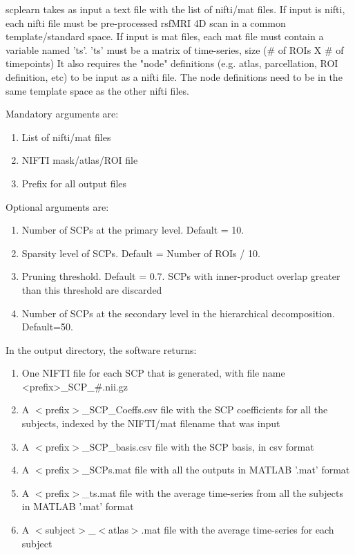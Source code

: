 \documentclass[12pt]{article}
\begin{document}
scplearn takes as input a text file with the list of nifti/mat files. If input is nifti, each nifti file must be pre-processed rsfMRI 4D scan in a common template/standard space. If input is mat files, each mat file must contain a variable named 'ts'. 'ts' must be a matrix of time-series,  size (\# of ROIs X \# of timepoints) It also requires the "node" definitions (e.g. atlas, parcellation, ROI definition, etc) to be input as a nifti file. The node definitions need to be in the same template space as the other nifti files.

Mandatory arguments are:
\begin{enumerate}
 \item List of nifti/mat files
 \item NIFTI mask/atlas/ROI file
 \item Prefix for all output files
\end{enumerate}

Optional arguments are:
\begin{enumerate}
 \item Number of SCPs at the primary level. Default = 10.
 \item Sparsity level of SCPs. Default = Number of ROIs / 10. 
 \item Pruning threshold. Default = 0.7. SCPs with inner-product overlap greater than this threshold are discarded
 \item Number of SCPs at the secondary level in the hierarchical decomposition. Default=50. 
\end{enumerate}
 
In the output directory, the software returns:
\begin{enumerate}
 \item One NIFTI file for each SCP that is generated, with file name <prefix>\_SCP\_\#.nii.gz
 \item A $<$prefix$>$\_SCP\_Coeffs.csv file with the SCP coefficients for all the subjects, indexed by the NIFTI/mat filename that was input
 \item A $<$prefix$>$\_SCP\_basis.csv file with the SCP basis, in csv format
 \item A $<$prefix$>$\_SCPs.mat file with all the outputs in MATLAB '.mat' format
 \item A $<$prefix$>$\_ts.mat file with the average time-series from all the subjects in MATLAB '.mat' format
 \item A $<$subject$>$\_$<$atlas$>$.mat file with the average time-series for each subject 
\end{enumerate}
\end{document}
